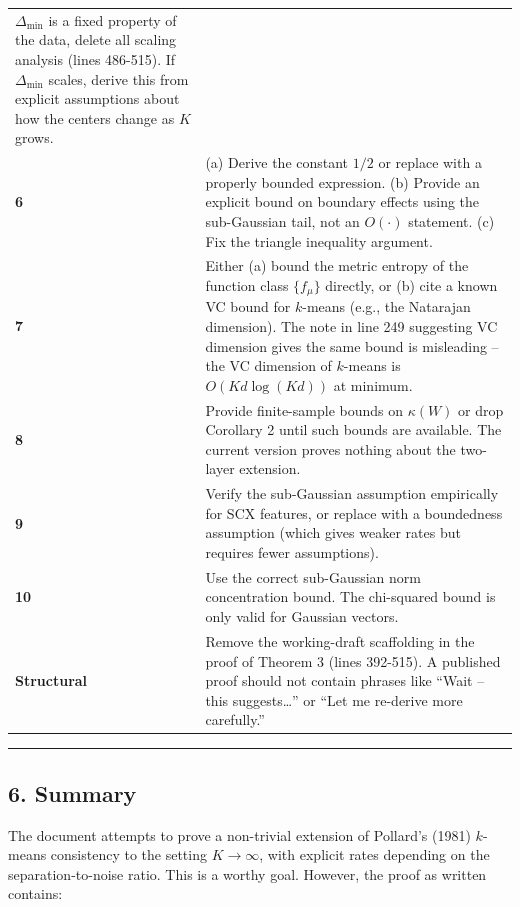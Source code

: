 \documentclass[
  12pt,
]{article}
\begin{document}
\begin{longtable}[]{@{}
  >{\raggedright\arraybackslash}p{}
  >{\raggedright\arraybackslash}p{}@{}}
\(\Delta_{\min}\) is a fixed property of the data, delete all scaling
analysis (lines 486-515). If \(\Delta_{\min}\) scales, derive this from
explicit assumptions about how the centers change as \(K\) grows. \\
\textbf{6} & (a) Derive the constant \(1/2\) or replace with a properly
bounded expression. (b) Provide an explicit bound on boundary effects
using the sub-Gaussian tail, not an \(O(\cdot)\) statement. (c) Fix the
triangle inequality argument. \\
\textbf{7} & Either (a) bound the metric entropy of the function class
\(\{f_\mu\}\) directly, or (b) cite a known VC bound for \(k\)-means
(e.g., the Natarajan dimension). The note in line 249 suggesting VC
dimension gives the same bound is misleading -- the VC dimension of
\(k\)-means is \(O(K d \log(K d))\) at minimum. \\
\textbf{8} & Provide finite-sample bounds on \(\kappa(W)\) or drop
Corollary 2 until such bounds are available. The current version proves
nothing about the two-layer extension. \\
\textbf{9} & Verify the sub-Gaussian assumption empirically for SCX
features, or replace with a boundedness assumption (which gives weaker
rates but requires fewer assumptions). \\
\textbf{10} & Use the correct sub-Gaussian norm concentration bound. The
chi-squared bound is only valid for Gaussian vectors. \\
\textbf{Structural} & Remove the working-draft scaffolding in the proof
of Theorem 3 (lines 392-515). A published proof should not contain
phrases like ``Wait -- this suggests\ldots{}'' or ``Let me re-derive
more carefully.'' \\
\end{longtable}

\begin{center}\rule{0.5\linewidth}{0.5pt}\end{center}

\subsection{6. Summary}\label{summary}

The document attempts to prove a non-trivial extension of Pollard's
(1981) \(k\)-means consistency to the setting \(K \to \infty\), with
explicit rates depending on the separation-to-noise ratio. This is a
worthy goal. However, the proof as written contains:
\end{document}
